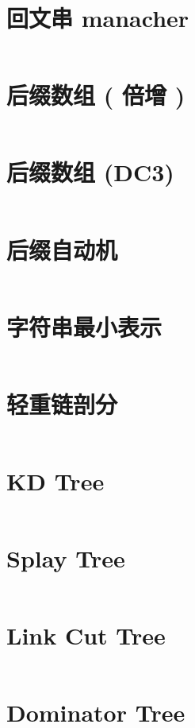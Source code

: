 \documentclass[titlepage,landscape,a4paper,10pt]{article}
\begin{document}
\begin{multicols}{2}
\begin{spacing}{0.8}
\section{回文串 manacher}
\inputminted{cpp}{src/回文串manacher.cpp}

\section{后缀数组 ( 倍增 )}
\inputminted{cpp}{src/后缀数组(nlogn).cpp}

\section{后缀数组 (DC3)}
\inputminted{cpp}{src/DC3.cpp}

\section{后缀自动机}
\inputminted{cpp}{src/后缀自动机.cpp}

\section{字符串最小表示}
\inputminted{cpp}{src/字符串最小表示.cpp}

\section{轻重链剖分}
\inputminted{cpp}{src/轻重链剖分.cpp}

\section{KD Tree}
\inputminted{cpp}{src/KDTree.cpp}

\section{Splay Tree}
\inputminted{cpp}{src/Splay.cpp}

\section{Link Cut Tree}
\inputminted{cpp}{src/LCT.cpp}

\section{Dominator Tree}
\inputminted{cpp}{src/Dominator Tree.cpp}


\end{spacing}
\end{multicols}
\end{document}
